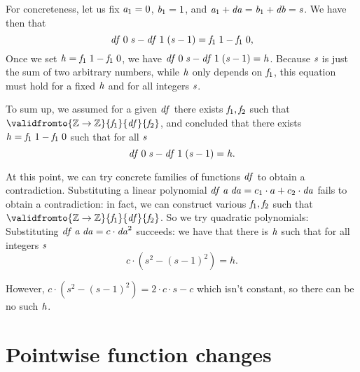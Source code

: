 \begin{example}
For concreteness, let us fix \ensuremath{\Varid{a}_{1}\mathrel{=}\mathrm{0}}, \ensuremath{\Varid{b}_{1}\mathrel{=}\mathrm{1}}, and \ensuremath{\Varid{a}_{1}\mathbin{+}\Varid{da}\mathrel{=}\Varid{b}_{1}\mathbin{+}\Varid{db}\mathrel{=}\Varid{s}}. We have then that
\[\mathit{df}\;\mathrm{0}\;\mathit{s}\mathbin{-}\mathit{df}\;\mathrm{1}\;(\mathit{s}\mathbin{-}\mathrm{1})\mathrel{=}\mathit{f}_{1}\;\mathrm{1}\mathbin{-}\mathit{f}_{1}\;\mathrm{0},\]
Once we set \ensuremath{\Varid{h}\mathrel{=}\Varid{f}_{1}\;\mathrm{1}\mathbin{-}\Varid{f}_{1}\;\mathrm{0}}, we have \ensuremath{\Varid{df}\;\mathrm{0}\;\Varid{s}\mathbin{-}\Varid{df}\;\mathrm{1}\;(\Varid{s}\mathbin{-}\mathrm{1})\mathrel{=}\Varid{h}}.
Because \ensuremath{\Varid{s}} is just the sum of two arbitrary numbers, while \ensuremath{\Varid{h}}
only depends on \ensuremath{\Varid{f}_{1}}, this equation must hold for a fixed \ensuremath{\Varid{h}} and
for all integers \ensuremath{\Varid{s}}.

To sum up, we assumed for a given \ensuremath{\Varid{df}} there exists \ensuremath{\Varid{f}_{1},\Varid{f}_{2}} such
that \ensuremath{\validfromto{\mathbb{Z}\to \mathbb{Z}}{\Varid{f}_{1}}{\Varid{df}}{\Varid{f}_{2}}}, and concluded that there
exists \ensuremath{\Varid{h}\mathrel{=}\Varid{f}_{1}\;\mathrm{1}\mathbin{-}\Varid{f}_{1}\;\mathrm{0}} such that for all \ensuremath{\Varid{s}}
\[\mathit{df}\;\mathrm{0}\;\mathit{s}\mathbin{-}\mathit{df}\;\mathrm{1}\;(\mathit{s}\mathbin{-}\mathrm{1})\mathrel{=}\mathit{h}.\]

At this point, we can try concrete families of functions \ensuremath{\Varid{df}} to
obtain a contradiction. Substituting a linear polynomial $\mathit{df}\;\mathit{a}\;\mathit{da} = c_1 \cdot a + c_2 \cdot \mathit{da}$ fails to obtain a
contradiction: in fact, we can construct various \ensuremath{\Varid{f}_{1},\Varid{f}_{2}} such
that \ensuremath{\validfromto{\mathbb{Z}\to \mathbb{Z}}{\Varid{f}_{1}}{\Varid{df}}{\Varid{f}_{2}}}. So we try quadratic
polynomials: Substituting $\mathit{df}\;\mathit{a}\;\mathit{da} = c \cdot \mathit{da}^2$ succeeds:
we have that there is \ensuremath{\Varid{h}} such that for all integers \ensuremath{\Varid{s}}
\[c \cdot \left(s^2 - (s - 1)^2\right) = h.\]

However, $c \cdot \left(s^2 - (s - 1)^2\right) = 2 \cdot c \cdot
s - c$ which isn't constant, so there can be no such \ensuremath{\Varid{h}}.
\end{example}

\section{Pointwise function changes}
\label{ssec:pointwise-changes}

